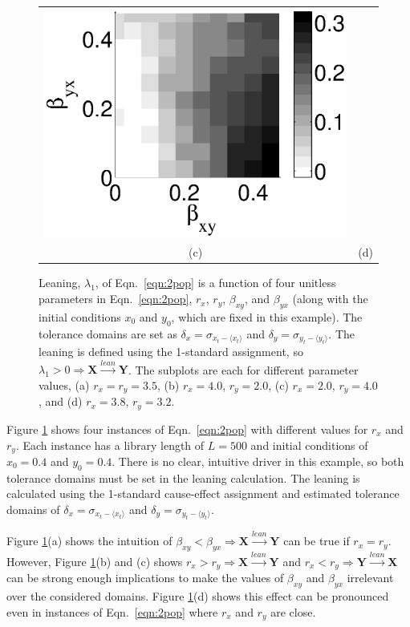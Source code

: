 \documentclass[twocolumn,aps,pre,groupedaddress]{revtex4-1}
\begin{document}
\begin{figure}[ht]
\begin{tabular}{cc}
\includegraphics[scale=0.34]{CoupLogexample_rx38ry32.eps} \\
(c) & (d) \\
\end{tabular}
\caption{Leaning, $\lambda_1$, of Eqn.\ \ref{eqn:2pop} is a function of four unitless parameters in Eqn.\ \ref{eqn:2pop}, $r_x$, $r_y$, $\beta_{xy}$, and $\beta_{yx}$ (along with the initial conditions $x_0$ and $y_0$, which are fixed in this example).  The tolerance domains are set as $\delta_x = \sigma_{x_t-\langle x_t \rangle}$ and $\delta_y = \sigma_{y_t-\langle y_t \rangle}$.  The leaning is defined using the 1-standard assignment, so $\lambda_1>0\Rightarrow\mathbf{X}\xrightarrow{lean}\mathbf{Y}$.  The subplots are each for different parameter values, (a) $r_x = r_y = 3.5$, (b) $r_x = 4.0$, $r_y = 2.0$, (c) $r_x = 2.0$, $r_y = 4.0$, and (d) $r_x = 3.8$, $r_y = 3.2$.}
\label{fig:2pop}
\end{figure}
Figure \ref{fig:2pop} shows four instances of Eqn.\ \ref{eqn:2pop} with different values for $r_x$ and $r_y$.  Each instance has a library length of $L=500$ and initial conditions of $x_0 = 0.4$ and $y_0 = 0.4$.  There is no clear, intuitive driver in this example, so both tolerance domains must be set in the leaning calculation.  The leaning is calculated using the 1-standard cause-effect assignment and estimated tolerance domains of $\delta_x = \sigma_{x_t-\langle x_t \rangle}$ and $\delta_y = \sigma_{y_t-\langle y_t \rangle}$.

Figure \ref{fig:2pop}(a) shows the intuition of $\beta_{xy}<\beta_{yx}\Rightarrow\mathbf{X}\xrightarrow{lean}\mathbf{Y}$ can be true if $r_x=r_y$.  However, Figure \ref{fig:2pop}(b) and (c) shows $r_x>r_y\Rightarrow\mathbf{X}\xrightarrow{lean}\mathbf{Y}$ and $r_x<r_y\Rightarrow\mathbf{Y}\xrightarrow{lean}\mathbf{X}$ can be strong enough implications to make the values of $\beta_{xy}$ and $\beta_{yx}$ irrelevant over the considered domains.  Figure \ref{fig:2pop}(d) shows this effect can be pronounced even in instances of Eqn.\ \ref{eqn:2pop} where $r_x$ and $r_y$ are close.  
\end{document}
